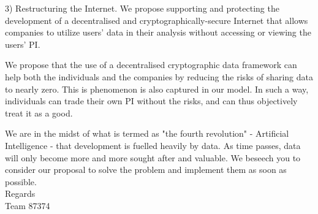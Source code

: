 \documentclass{icmmcm}
\begin{document}
3) Restructuring the Internet. We propose supporting and protecting the development of a decentralised and cryptographically-secure Internet that allows companies to utilize users' data in their analysis without accessing or viewing the users' PI. 

We propose that the use of a decentralised cryptographic data framework can help both the individuals and the companies by reducing the risks of sharing data to nearly zero. This is phenomenon is also captured in our model. In such a way, individuals can trade their own PI without the risks, and can thus objectively treat it as a good.

We are in the midst of what is termed as "the fourth revolution" - Artificial Intelligence - that development is fuelled heavily by data. As time passes, data will only become more and more sought after and valuable. We beseech you to consider our proposal to solve the problem and implement them as soon as possible. \\

\noindent
Regards \\
Team 87374
\newpage



\end{document}
